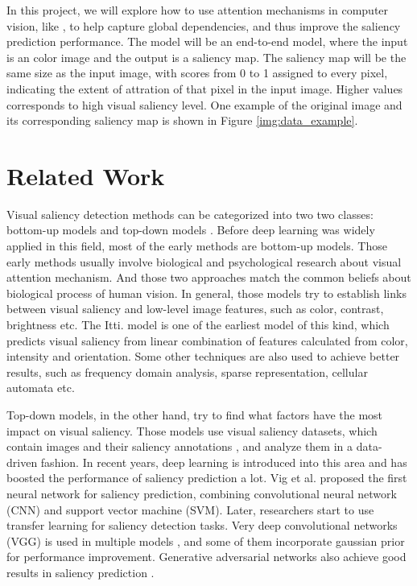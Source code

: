 \documentclass[12pt]{article}
\begin{document}
In this project, we will explore how to use attention mechanisms in computer vision, like \cite{zhangSelfAttentionGenerativeAdversarial2019a},
to help capture global dependencies, and thus improve the saliency prediction performance. 
The model will be an end-to-end model, where the input is an color image and the output is a saliency map.
The saliency map will be the same size as the input image, with scores from 0 to 1 assigned to 
every pixel, indicating the extent of attration of that pixel in the input image.
Higher values corresponds to high visual saliency level.
One example of the original image and its corresponding saliency map is shown in Figure \ref{img:data_example}.



\section{Related Work}

Visual saliency detection methods can be categorized into two two classes: bottom-up models and top-down models \cite{congReviewVisualSaliency2019}.
Before deep learning was widely applied in this field, most of the early methods are bottom-up models.
Those early methods usually involve biological and psychological research about visual attention mechanism. And those two approaches match the common beliefs about biological process of human vision.
In general, those models try to establish links between visual saliency and low-level image features, such as color, contrast, brightness etc. The Itti. model\cite{ittiModelSaliencybasedVisual1998}
is one of the earliest model of this kind, which predicts visual saliency from linear combination of features calculated from color, intensity and orientation.
Some other techniques are also used to achieve better results, such as frequency domain analysis, sparse representation, cellular automata etc. \cite{congReviewVisualSaliency2019}

Top-down models, in the other hand, try to find what factors have the most impact on visual saliency. Those models use visual saliency datasets, which contain images and their saliency annotations
, and analyze them in a data-driven fashion.
In recent years, deep learning is introduced into this area and has boosted the performance of saliency prediction a lot.
Vig et al. \cite{vigLargeScaleOptimizationHierarchical2014} proposed the first neural network for saliency prediction, combining convolutional neural network (CNN) and support vector machine (SVM). Later, researchers start to use transfer learning for saliency 
detection tasks. Very deep convolutional networks (VGG) is used in multiple models \cite{kruthiventiDeepFixFullyConvolutional2015, kummererDeepGazeIIReading2016, corniaPredictingHumanEye2018}, and some of them incorporate gaussian prior for performance improvement.
Generative adversarial networks also achieve good results in saliency prediction \cite{panSalGANVisualSaliency2018, cheHowGazeInfluenced2020}.
\end{document}

